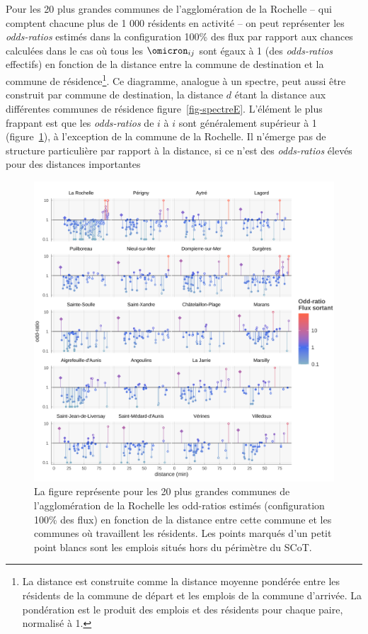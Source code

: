 \documentclass[
  10pt,
  a4paper,
  numbers=noendperiod,
  DIV=9]{scrartcl}
\begin{document}
Pour les 20 plus grandes communes de l'agglomération de la Rochelle --
qui comptent chacune plus de 1 000 résidents en activité -- on peut
représenter les \emph{odds-ratios} estimés dans la configuration 100\%
des flux par rapport aux chances calculées dans le cas où tous les
\(\omicron_{ij}\) sont égaux à 1 (des \emph{odds-ratios} effectifs) en
fonction de la distance entre la commune de destination et la commune de
résidence\footnote{La distance est construite comme la distance moyenne
  pondérée entre les résidents de la commune de départ et les emplois de
  la commune d'arrivée. La pondération est le produit des emplois et des
  résidents pour chaque paire, normalisé à 1.}. Ce diagramme, analogue à
un spectre, peut aussi être construit par commune de destination, la
distance \(d\) étant la distance aux différentes communes de résidence
figure~\ref{fig-spectreE}. L'élément le plus frappant est que les
\emph{odds-ratios} de \(i\) à \(i\) sont généralement supérieur à 1
(figure~\ref{fig-spectreR}), à l'exception de la commune de la Rochelle.
Il n'émerge pas de structure particulière par rapport à la distance, si
ce n'est des \emph{odds-ratios} élevés pour des distances importantes

\begin{figure}[htb]

{\centering \includegraphics[width=1\textwidth,height=\textheight]{output/spectre effectif par COMMUNE 100.png}

}

\caption[Odd-ratio par commune de résidence fonction de la distance aux
communes d'emploi (spectre résidents)]{\label{fig-spectreR}La figure
représente pour les 20 plus grandes communes de l'agglomération de la
Rochelle les odd-ratios estimés (configuration 100\% des flux) en
fonction de la distance entre cette commune et les communes où
travaillent les résidents. Les points marqués d'un petit point blancs
sont les emplois situés hors du périmètre du SCoT.}

\end{figure}
\end{document}
